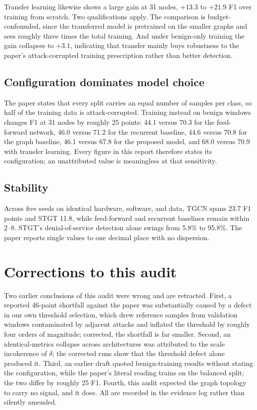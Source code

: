 \documentclass[11pt]{article}
\begin{document}
Transfer learning likewise shows a large gain at 31 nodes, $+13.3$ to $+21.9$ F1
over training from scratch. Two qualifications apply. The comparison is
budget-confounded, since the transferred model is pretrained on the smaller
graphs and sees roughly three times the total training. And under benign-only
training the gain collapses to $+3.1$, indicating that transfer mainly buys
robustness to the paper's attack-corrupted training prescription rather than
better detection.

\subsection{Configuration dominates model choice}

The paper states that every split carries an equal number of samples per class,
so half of the training data is attack-corrupted. Training instead on benign
windows changes F1 at 31 nodes by roughly 25 points: 44.1 versus 70.3 for the
feed-forward network, 46.0 versus 71.2 for the recurrent baseline, 44.6 versus
70.8 for the graph baseline, 46.1 versus 67.8 for the proposed model, and 68.0
versus 70.9 with transfer learning. Every figure in this report therefore states
its configuration; an unattributed value is meaningless at that sensitivity.

\subsection{Stability}

Across five seeds on identical hardware, software, and data, TGCN spans 23.7 F1
points and STGT 11.8, while feed-forward and recurrent baselines remain within
2--8. STGT's denial-of-service detection alone swings from 5.8\% to 95.8\%. The
paper reports single values to one decimal place with no dispersion.

\section{Corrections to this audit}

Two earlier conclusions of this audit were wrong and are retracted. First, a
reported 46-point shortfall against the paper was substantially caused by a
defect in our own threshold selection, which drew reference samples from
validation windows contaminated by adjacent attacks and inflated the threshold
by roughly four orders of magnitude; corrected, the shortfall is far smaller.
Second, an identical-metrics collapse across architectures was attributed to the
scale incoherence of $\delta$; the corrected runs show that the threshold defect
alone produced it. Third, an earlier draft quoted benign-training results without
stating the configuration, while the paper's literal reading trains on the
balanced split; the two differ by roughly 25 F1. Fourth, this audit expected the
graph topology to carry no signal, and it does. All are recorded in the evidence
log rather than silently amended.
\end{document}
